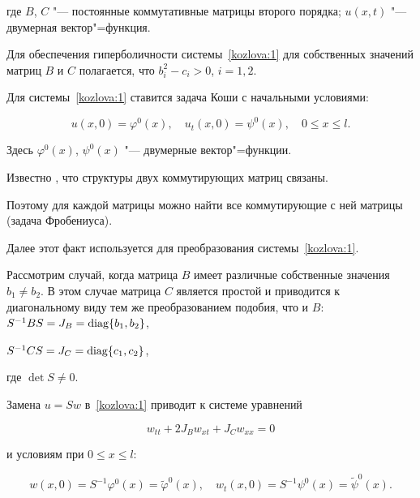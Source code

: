 где $B$, $C$ "--- постоянные коммутативные матрицы второго порядка; $u(x,t)$ "--- двумерная вектор"=функция.

Для обеспечения гиперболичности \cite{kozlova:bib:Bitsadze} системы~\eqref{kozlova:1}  для собственных значений матриц $B$ и $C$ полагается, что $b_i^2-c_i>0$, $i=1, 2$.



Для системы~\eqref{kozlova:1} ставится задача Коши с начальными условиями:

\begin{equation*}


u(x,0)=\varphi^0(x),\quad u_t(x,0)=\psi^0(x),\quad 0\leq{x}\leq{l}.

\end{equation*}

Здесь $\varphi^0(x)$, $\psi^0(x)$ "--- двумерные вектор"=функции.



Известно \cite{kozlova:bib:Gantmaher}, что структуры двух коммутирующих матриц связаны.

Поэтому для каждой матрицы можно найти все коммутирующие с ней матрицы (задача Фробениуса).

Далее этот факт используется для преобразования системы~\eqref{kozlova:1}.



\smallskip



Рассмотрим случай, когда  матрица $B$ имеет различные собственные значения $b_1\neq b_2$. В этом случае матрица $C$ является простой и приводится к диагональному виду тем же преобразованием подобия, что и $B$: $S^{-1}BS=J_B=\mathop{\rm diag}\{b_1, b_2\}$,

$S^{-1}CS=J_{C}=\mathop{\rm diag}\{c_1, c_2\}$,

где $\det S\neq 0$.

Замена $u=Sw$ в~\eqref{kozlova:1} приводит к системе уравнений

\begin{equation*}

w_{tt}+2J_{B}w_{xt}+J_{C}w_{xx}=0

\end{equation*}

и условиям при $0\leq{x}\leq{l}$:

\begin{equation}

\label{kozlova:3}

w(x,0)=S^{-1}{\varphi}^0(x)=\tilde{\varphi}^0(x),\quad w_t(x,0)=S^{-1}\psi^0(x)=\tilde{\psi}^0(x).

\end{equation}



